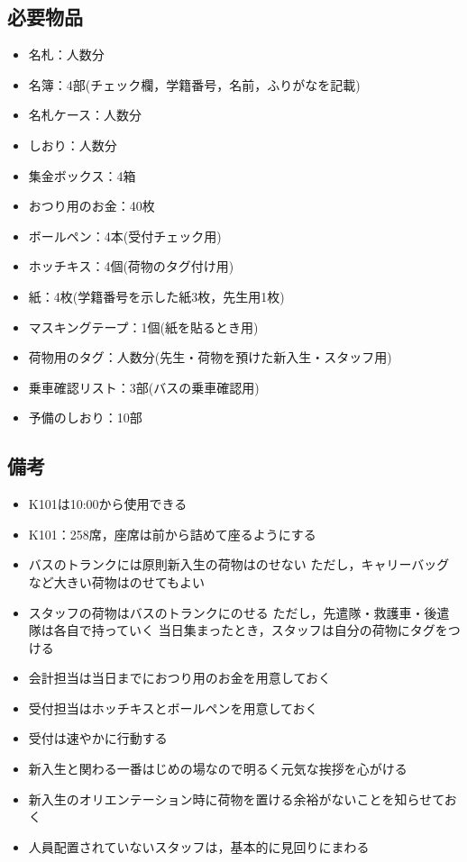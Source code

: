 


\subsection{必要物品}
\begin{itemize}
\item 名札：人数分
\item 名簿：4部(チェック欄，学籍番号，名前，ふりがなを記載)
\item 名札ケース：人数分
\item しおり：人数分
\item 集金ボックス：4箱
\item おつり用のお金：40枚
\item ボールペン：4本(受付チェック用)
\item ホッチキス：4個(荷物のタグ付け用)
\item 紙：4枚(学籍番号を示した紙3枚，先生用1枚)
\item マスキングテープ：1個(紙を貼るとき用)
\item 荷物用のタグ：人数分(先生・荷物を預けた新入生・スタッフ用)
\item 乗車確認リスト：3部(バスの乗車確認用)
\item 予備のしおり：10部
\end{itemize}


\subsection{備考}
\begin{itemize}
\item K101は10:00から使用できる
\item K101：258席，座席は前から詰めて座るようにする
\item バスのトランクには原則新入生の荷物はのせない ただし，キャリーバッグなど大きい荷物はのせてもよい
\item スタッフの荷物はバスのトランクにのせる ただし，先遣隊・救護車・後遣隊は各自で持っていく 当日集まったとき，スタッフは自分の荷物にタグをつける
\item 会計担当は当日までにおつり用のお金を用意しておく
\item 受付担当はホッチキスとボールペンを用意しておく
\item 受付は速やかに行動する
\item 新入生と関わる一番はじめの場なので明るく元気な挨拶を心がける
\item 新入生のオリエンテーション時に荷物を置ける余裕がないことを知らせておく
\item 人員配置されていないスタッフは，基本的に見回りにまわる
\end{itemize}



